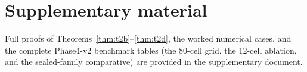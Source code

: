 \documentclass[11pt]{article}
\begin{document}
\section*{Supplementary material}
Full proofs of Theorems~\ref{thm:t2b}--\ref{thm:t2d}, the worked numerical cases, and the
complete Phase4-v2 benchmark tables (the 80-cell grid, the 12-cell ablation, and the sealed-family
comparative) are provided in the supplementary document.



\end{document}

